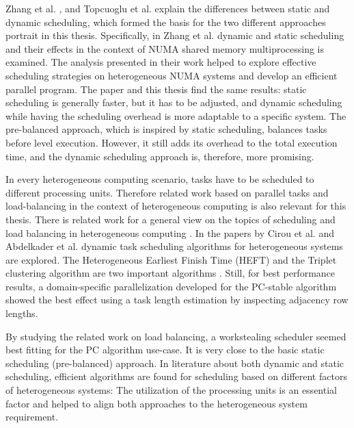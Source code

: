 Zhang et al. \cite{zhangDynamicStaticLoad1991}, and Topcuoglu et al. \cite{topcuogluPerformanceeffectiveLowcomplexityTask2002} explain the differences between static and dynamic scheduling, which formed the basis for the two different approaches portrait in this thesis. Specifically, in Zhang et al. \cite{zhangDynamicStaticLoad1991} dynamic and static scheduling and their effects in the context of NUMA shared memory multiprocessing is examined. The analysis presented in their work helped to explore effective scheduling strategies on heterogeneous NUMA systems and develop an efficient parallel program. The paper and this thesis find the same results: static scheduling is generally faster, but it has to be adjusted, and dynamic scheduling while having the scheduling overhead is more adaptable to a specific system.
The pre-balanced approach, which is inspired by static scheduling, balances tasks before level execution. However, it still adds its overhead to the total execution time, and the dynamic scheduling approach is, therefore, more promising.

In every heterogeneous computing scenario, tasks have to be scheduled to different processing units. Therefore related work based on parallel tasks and load-balancing in the context of heterogeneous computing is also relevant for this thesis. There is related work for a general view on the topics of scheduling and load balancing in heterogeneous computing \cite{cirouTripletClusteringScheduling2001, abdelkaderDynamicTaskScheduling2012,binottoDynamicReconfigurableLoadbalancing2010,galindoDynamicLoadBalancing2008,kopetzRealTimeScheduling1997,kwokStaticSchedulingAlgorithms1999,momcilovicDynamicLoadBalancing2014,singhSurveyStaticScheduling2015}. In the papers by Cirou et al. \cite{cirouTripletClusteringScheduling2001} and Abdelkader et al. \cite{abdelkaderDynamicTaskScheduling2012} dynamic task scheduling algorithms for heterogeneous systems are explored. The Heterogeneous Earliest Finish Time (HEFT) and the Triplet clustering algorithm are two important algorithms \cite{abdelkaderDynamicTaskScheduling2012}. Still, for best performance results, a domain-specific parallelization developed for the PC-stable algorithm showed the best effect using a task length estimation by inspecting adjacency row lengths.

By studying the related work on load balancing, a workstealing scheduler seemed best fitting for the PC algorithm use-case. It is very close to the basic static scheduling (pre-balanced) approach. In literature about both dynamic and static scheduling, efficient algorithms are found for scheduling based on different factors of heterogeneous systems: The utilization of the processing units is an essential factor and helped to align both approaches to the heterogeneous system requirement. 

